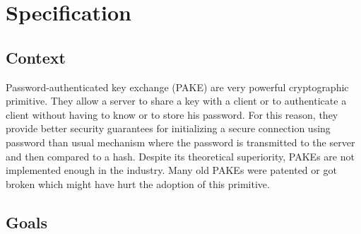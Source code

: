 ﻿\documentclass[../report.tex]{subfiles}
\begin{document}
\chapter{Specification}
\section*{Context}


Password-authenticated key exchange (PAKE) are very powerful cryptographic primitive. They allow a server to share a key with a client or to authenticate a client without having to know or to store his password.
For this reason, they provide better security guarantees for initializing a secure connection using password than usual mechanism where the password is transmitted to the server and then compared to a hash.
Despite its theoretical superiority, PAKEs are not implemented enough in the industry. Many old PAKEs were patented or got broken which might have hurt the adoption of this primitive.
\section*{Goals}

% 
% 
% 
% 
\end{document}
